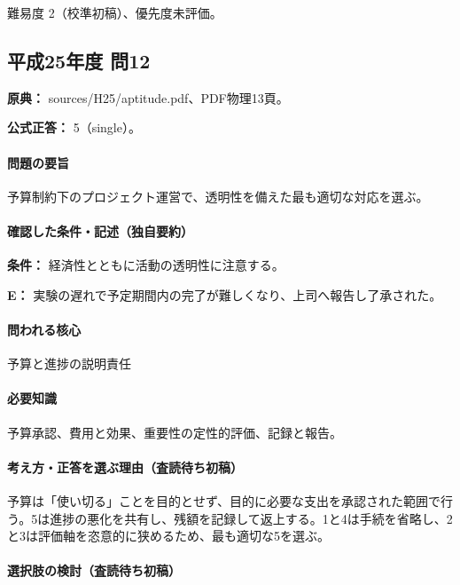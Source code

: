 \par 難易度 2（校準初稿）、優先度未評価。

\subsection{平成25年度 問12}
\label{q:h25-reg-apt-12}

\noindent\textbf{原典：} sources/H25/aptitude.pdf、PDF物理13頁。

\textbf{公式正答：} 5（single）。

\paragraph{問題の要旨} 予算制約下のプロジェクト運営で、透明性を備えた最も適切な対応を選ぶ。

\paragraph{確認した条件・記述（独自要約）}\mbox{}\par

\noindent\textbf{条件：} 経済性とともに活動の透明性に注意する。\par

\noindent\textbf{E：} 実験の遅れで予定期間内の完了が難しくなり、上司へ報告し了承された。\par

\paragraph{問われる核心} 予算と進捗の説明責任

\paragraph{必要知識} 予算承認、費用と効果、重要性の定性的評価、記録と報告。

\paragraph{考え方・正答を選ぶ理由（査読待ち初稿）} 予算は「使い切る」ことを目的とせず、目的に必要な支出を承認された範囲で行う。5は進捗の悪化を共有し、残額を記録して返上する。1と4は手続を省略し、2と3は評価軸を恣意的に狭めるため、最も適切な5を選ぶ。

\paragraph{選択肢の検討（査読待ち初稿）}\mbox{}\par

